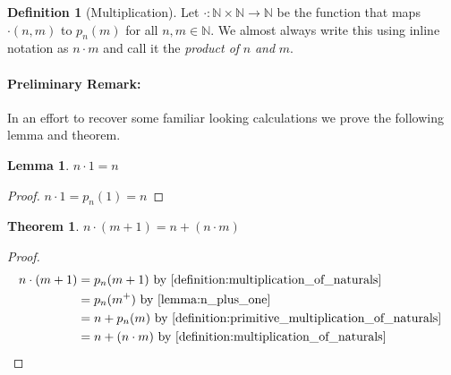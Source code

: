 \documentclass{article}
\theoremstyle{definition}
\newtheorem{definition}{Definition}[section]
\theoremstyle{definition}
\theoremstyle{plain}
\theoremstyle{remark}
\theoremstyle{plain}
\newtheorem{theorem}{Theorem}[section]
\theoremstyle{remark}
\theoremstyle{plain}
\newtheorem{lemma}{Lemma}[section]
\theoremstyle{plain}
\theoremstyle{plain}
\theoremstyle{plain}
\begin{document}
\begin{definition}[Multiplication]
  Let \( \cdot : \mathbb{N} \times \mathbb{N} \rightarrow \mathbb{N} \) be the 
  function that maps \( \cdot(n, m) \) to \( p_n(m) \) for all 
  \( n, m \in \mathbb{N} \). 
  We almost always write this using inline notation as \( n \cdot m \) and call 
  it the \textit{product of} \( n \) \textit{and} \(m\). 
  \label{definition:multiplication_of_naturals}
\end{definition}

\paragraph{Preliminary Remark:}
In an effort to recover some familiar looking calculations we prove the 
following lemma and theorem.

\begin{lemma}
  \( n \cdot 1 = n \)
  \label{lemma:n_times_one}
\end{lemma}

\begin{proof}
  \( n \cdot 1 = p_n(1) = n \)
\end{proof}

\begin{theorem}
  \( n \cdot (m + 1) = n + (n \cdot m) \)
\end{theorem}

\begin{proof}
  \begin{align*}
    n \cdot (m+1) &= p_n(m+1)  
                     \text{
                       by \autoref{definition:multiplication_of_naturals}
                     } \\
                  &= p_n(m^{+})
                     \text{
                       by \autoref{lemma:n_plus_one}
                     } \\
                  &= n + p_n(m)
                     \text{
                       by \autoref{%
                            definition:primitive_multiplication_of_naturals%
                          }
                     } \\
                  &= n + (n \cdot m)
                     \text{
                       by \autoref{%
                            definition:multiplication_of_naturals%
                          }
                     } \\
  \end{align*}
\end{proof}
\end{document}

